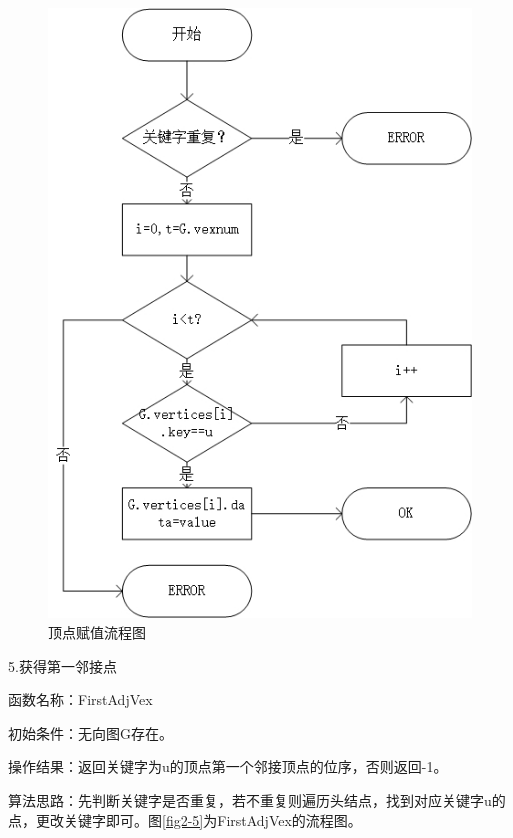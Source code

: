 \documentclass[supercite]{Experimental_Report}
\theoremstyle{definition}
\begin{document}
\begin{figure}[htb] %
	\begin{center}
		\includegraphics[scale=0.9]{./images/图/Put.jpg}
		\caption{顶点赋值流程图}
		\label{fig2-4}
	\end{center}
\end{figure}

\newpage

5.获得第一邻接点

函数名称：FirstAdjVex

初始条件：无向图G存在。

操作结果：返回关键字为u的顶点第一个邻接顶点的位序，否则返回-1。

算法思路：先判断关键字是否重复，若不重复则遍历头结点，找到对应关键字u的点，更改关键字即可。图\ref{fig2-5}为FirstAdjVex的流程图。
\end{document}
